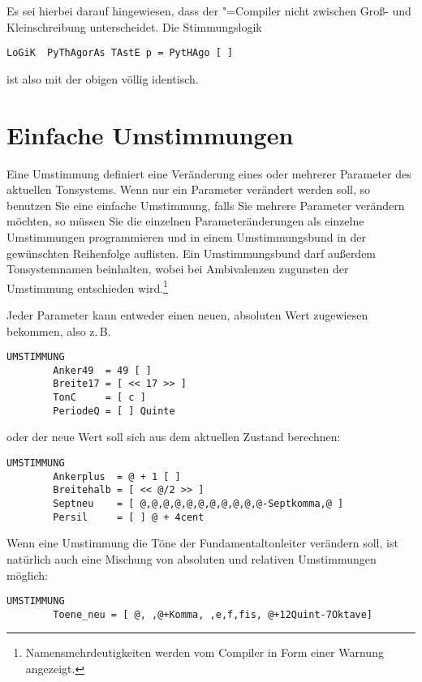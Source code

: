 Es sei hierbei darauf hingewiesen, dass der \mutabor{}"=Compiler nicht
zwischen Groß- und Kleinschreibung unterscheidet. Die Stimmungslogik

\begin{verbatim}
LoGiK  PyThAgorAs TAstE p = PytHAgo [ ]
\end{verbatim}

ist also mit der obigen völlig identisch.

\section{Einfache Umstimmungen}\label{sec:einf-umst}

Eine Umstimmung definiert eine Veränderung eines oder mehrerer
Parameter des aktuellen Tonsystems. Wenn nur ein Parameter verändert
werden soll, so benutzen Sie eine einfache Umstimmung, falls Sie
mehrere Parameter verändern möchten, so müssen Sie die einzelnen
Parameteränderungen als einzelne Umstimmungen programmieren und in
einem Umstimmungsbund in der gewünschten Reihenfolge auflisten. Ein
Umstimmungsbund darf außerdem Tonsystemnamen beinhalten, wobei bei
Ambivalenzen zugunsten der Umstimmung entschieden
wird.\footnote{Namensmehrdeutigkeiten werden vom Compiler in Form einer
Warnung angezeigt.}

Jeder Parameter kann entweder einen neuen, absoluten Wert zugewiesen
bekommen, also z.\,B.

\begin{verbatim}
UMSTIMMUNG
	    Anker49  = 49 [ ]
	    Breite17 = [ << 17 >> ]
	    TonC     = [ c ]
	    PeriodeQ = [ ] Quinte
\end{verbatim}

oder der neue Wert soll sich aus dem aktuellen Zustand berechnen:

\begin{verbatim}
UMSTIMMUNG
	    Ankerplus  = @ + 1 [ ]
	    Breitehalb = [ << @/2 >> ]
	    Septneu    = [ @,@,@,@,@,@,@,@,@,@,@-Septkomma,@ ]
	    Persil     = [ ] @ + 4cent
\end{verbatim}

Wenn eine Umstimmung die Töne der Fundamentaltonleiter verändern
soll, ist natürlich auch eine Mischung von absoluten und relativen
Umstimmungen möglich:

\begin{verbatim}
UMSTIMMUNG
	    Toene_neu = [ @, ,@+Komma, ,e,f,fis, @+12Quint-7Oktave]
\end{verbatim}

